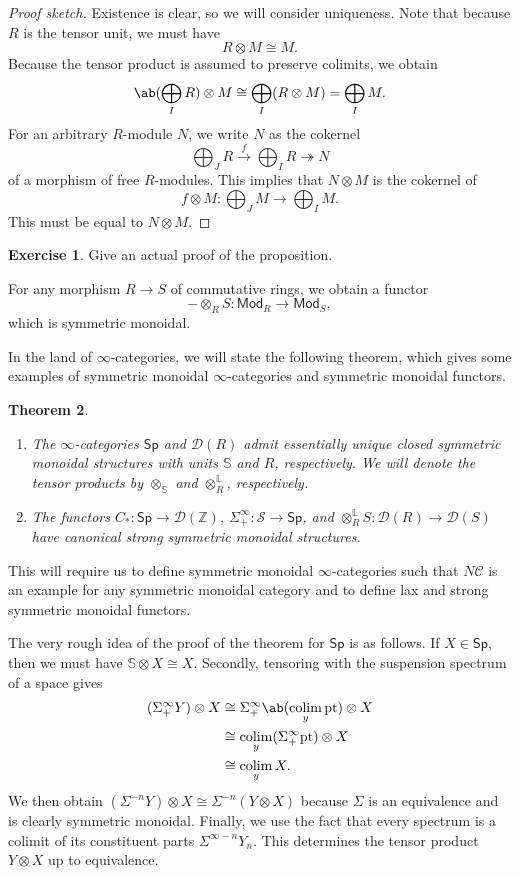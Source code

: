 \documentclass[10pt, oneside]{memoir}
\newtheorem{thm}{Theorem}[subsection]
\theoremstyle{definition}
\newtheorem{exer}[thm]{Exercise}
\theoremstyle{remark}
\theoremstyle{plain}
\theoremstyle{definition}
\theoremstyle{remark}
\newcommand{\Z}{\mathbb{Z}}
\newcommand{\bS}{\mathbb{S}}
\renewcommand{\L}{\mathbb{L}}
\newcommand{\mc}[1]{\mathcal{#1}}
\newcommand{\mr}[1]{\mathrm{#1}}
\newcommand{\ms}[1]{\mathsf{#1}}
\newcommand{\1}{\mathbf{1}}
\newcommand{\2}{\mathbf{2}}
\newcommand{\3}{\mathbf{3}}
\newcommand{\pt}{\mr{pt}}
\DeclareMathOperator*{\colim}{colim}
\begin{document}
\begin{proof}[Proof sketch]
    Existence is clear, so we will consider uniqueness. Note that because $R$ is the tensor unit, we must have
    \[ R \otimes M \cong M. \]
    Because the tensor product is assumed to preserve colimits, we obtain
    \[ \ab(\bigoplus_I R) \otimes M \cong \bigoplus_I (R \otimes M) = \bigoplus_I M. \]
    For an arbitrary $R$-module $N$, we write $N$ as the cokernel 
    \[ \bigoplus_J R \xrightarrow{f} \bigoplus_I R \twoheadrightarrow N \]
    of a morphism of free $R$-modules. This implies that $N \otimes M$ is the cokernel of
    \[ f \otimes M \colon \bigoplus_J M \to \bigoplus_I M. \]
    This must be equal to $N \otimes M$.
\end{proof}

\begin{exer}
    Give an actual proof of the proposition.
\end{exer}

For any morphism $R \to S$ of commutative rings, we obtain a functor
\[ - \otimes_R S \colon \ms{Mod}_R \to \ms{Mod}_S, \]
which is symmetric monoidal.

In the land of $\infty$-categories, we will state the following theorem, which gives some examples of symmetric monoidal $\infty$-categories and symmetric monoidal functors.
\begin{thm}\label{thm:symmetricmonoidal}\leavevmode
    \begin{enumerate}
        \item The $\infty$-categories $\ms{Sp}$ and $\mc{D}(R)$ admit essentially unique closed symmetric monoidal structures with units $\bS$ and $R$, respectively. We will denote the tensor products by $\otimes_{\bS}$ and $\otimes_R^{\L}$, respectively.
        \item The functors $C_* \colon \ms{Sp} \to \mc{D}(\Z)$, $\Sigma_+^{\infty} \colon \mc{S} \to \ms{Sp}$, and $\otimes_R^{\L} S \colon \mc{D}(R) \to \mc{D}(S)$ have canonical strong symmetric monoidal structures.
    \end{enumerate}
\end{thm}

This will require us to define symmetric monoidal $\infty$-categories such that $N\mc{C}$ is an example for any symmetric monoidal category and to define lax and strong symmetric monoidal functors.

The very rough idea of the proof of the theorem for $\ms{Sp}$ is as follows. If $X \in \ms{Sp}$, then we must have $\bS \otimes X \cong X$. Secondly, tensoring with the suspension spectrum of a space gives
\begin{align*}
    (\Sigma_+^{\infty} Y) \otimes X &\cong \Sigma_+^{\infty} \ab(\colim_y \pt) \otimes X \\
    &\cong \colim_y (\Sigma_+^{\infty} \pt) \otimes X \\
    &\cong \colim_y X.
\end{align*}
We then obtain $(\Sigma^{-n} Y) \otimes X \cong \Sigma^{-n} (Y \otimes X)$ because $\Sigma$ is an equivalence and is clearly symmetric monoidal. Finally, we use the fact that every spectrum is a colimit of its constituent parts $\Sigma^{\infty -n} Y_n$. This determines the tensor product $Y \otimes X$ up to equivalence.
\end{document}
